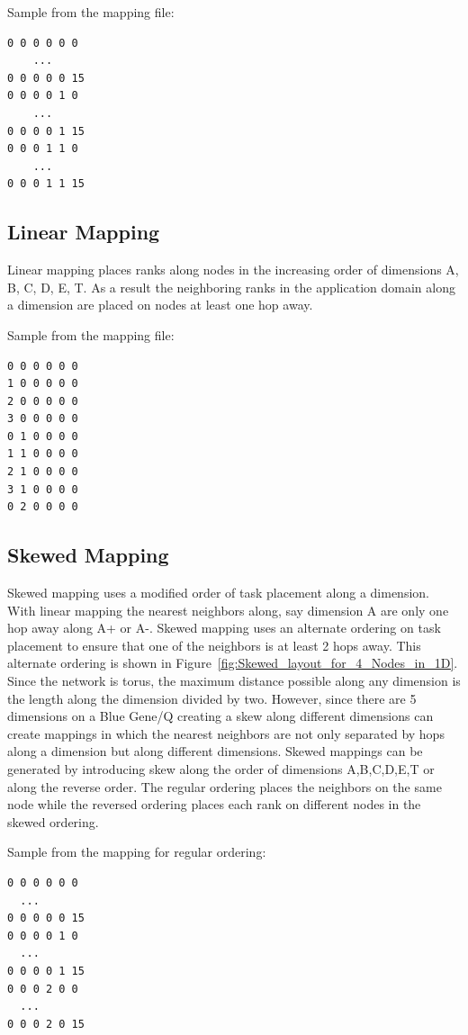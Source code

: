 \documentclass{acm_proc_article-sp}
\begin{document}
Sample from the mapping file:
\begin{lstlisting}[frame=lines, basicstyle=\ttfamily,columns=fixed]
0 0 0 0 0 0
    ...
0 0 0 0 0 15
0 0 0 0 1 0
    ...
0 0 0 0 1 15
0 0 0 1 1 0
    ...
0 0 0 1 1 15
\end{lstlisting}

\subsection{Linear Mapping}
Linear mapping places ranks along nodes in the increasing order of dimensions A, B, C, D, E, T.
As a result the neighboring ranks in the application domain along a dimension are placed on nodes at least
one hop away.

Sample from the mapping file:
\begin{lstlisting}[frame=lines, basicstyle=\ttfamily,columns=fixed]
0 0 0 0 0 0
1 0 0 0 0 0
2 0 0 0 0 0
3 0 0 0 0 0
0 1 0 0 0 0
1 1 0 0 0 0
2 1 0 0 0 0
3 1 0 0 0 0
0 2 0 0 0 0
\end{lstlisting}

\subsection{Skewed Mapping}

Skewed mapping uses a modified order of task placement along a dimension.
With linear mapping the nearest neighbors along, say dimension A are only one hop away along A+ or A-.
Skewed mapping uses an alternate ordering on task placement to ensure that one of the neighbors is at least
2 hops away. This alternate ordering is shown in Figure~\ref{fig:Skewed_layout_for_4_Nodes_in_1D}.
Since the network is torus, the maximum distance possible along any dimension is the length along
the dimension divided by two. However, since there are 5 dimensions on a Blue Gene/Q creating a skew along different
dimensions can create mappings in which the nearest neighbors are not only separated by hops along a dimension but
along different dimensions. Skewed mappings can be generated by introducing skew along the order of dimensions
A,B,C,D,E,T or along the reverse order. The regular ordering places the neighbors on the same node while the reversed
ordering places each rank on different nodes in the skewed ordering.

Sample from the mapping for regular ordering:
\begin{lstlisting}[frame=lines, basicstyle=\ttfamily,columns=fixed]
0 0 0 0 0 0
  ...
0 0 0 0 0 15
0 0 0 0 1 0
  ...
0 0 0 0 1 15
0 0 0 2 0 0
  ...
0 0 0 2 0 15
\end{lstlisting}
\end{document}
